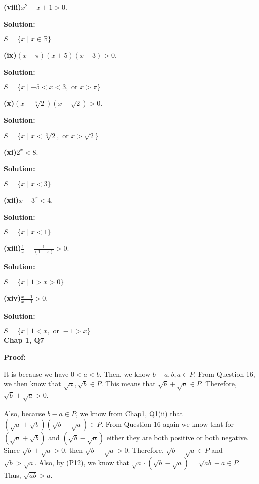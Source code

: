 \documentclass[a4paper,12pt]{report}
\begin{document}
\noindent
\textbf{(viii)}$x^2+x+1>0$.

\noindent
\textbf{Solution:}

\noindent
$S=\{x \mid x \in \mathbb{R}\}$

\noindent
\textbf{(ix)}$(x-\pi)(x+5)(x-3)>0$.

\noindent
\textbf{Solution:}

\noindent
$S=\{x \mid -5<x<3, \text{ or } x>\pi\}$

\noindent
\textbf{(x)}$(x-\sqrt[3]{2})(x-\sqrt{2})>0$.

\noindent
\textbf{Solution:}

\noindent
$S=\{x \mid x<\sqrt[3]{2}, \text{ or } x>\sqrt{2}\}$

\noindent
\textbf{(xi)}$2^x<8$.

\noindent
\textbf{Solution:}

\noindent
$S=\{x \mid x<3\}$

\noindent
\textbf{(xii)}$x+3^x<4$.

\noindent
\textbf{Solution:}

\noindent
$S=\{x \mid x<1\}$

\noindent
\textbf{(xiii)}$\frac{1}{x}+\frac{1}{(1-x)}>0$.

\noindent
\textbf{Solution:}

\noindent
$S=\{x \mid 1>x>0\}$

\noindent
\textbf{(xiv)}$\frac{x-1}{x+1}>0$.

\noindent
\textbf{Solution:}

\noindent
$S=\{x \mid 1<x, \text{ or }-1>x\}$\\

\noindent
\textbf{Chap 1, Q7}

\noindent
\textbf{Proof: }

It is because we have $0<a<b$. Then, we know $b-a,b,a\in P$. From Question 16, we then know that $\sqrt{a},\sqrt{b}\in P$. This means that $\sqrt{b} + \sqrt{a}\in P$. Therefore, $\sqrt{b} + \sqrt{a}>0$.

Also, because $b-a \in P$, we know from Chap1, Q1(ii) that $(\sqrt{a}+\sqrt{b})(\sqrt{b}-\sqrt{a}) \in P$. From Question 16 again we know that for $(\sqrt{a}+\sqrt{b})$ and $(\sqrt{b}-\sqrt{a})$ either they are both positive or both negative. Since $\sqrt{b} + \sqrt{a}>0$, then $\sqrt{b}-\sqrt{a}>0$. Therefore, $\sqrt{b}-\sqrt{a}\in P$ and $\sqrt{b}>\sqrt{a}$. Also, by (P12), we know that $\sqrt{a}\cdot{(\sqrt{b}-\sqrt{a})} = \sqrt{ab}- a\in P$. Thus, $\sqrt{ab}>a$.
\end{document}
